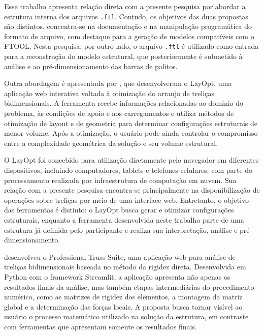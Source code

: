 Esse trabalho apresenta relação direta com a presente pesquisa por abordar a estrutura interna dos arquivos \texttt{.ftl}. Contudo, os objetivos das duas propostas são distintos.  concentra-se na documentação e na manipulação programática do formato de arquivo, com destaque para a geração de modelos compatíveis com o \acrshort{FTOOL}. Nesta pesquisa, por outro lado, o arquivo \texttt{.ftl} é utilizado como entrada para a reconstrução do modelo estrutural, que posteriormente é submetido à análise e ao pré-dimensionamento das barras de palitos.

Outra abordagem é apresentada por , que desenvolveram o LayOpt, uma aplicação web interativa voltada à otimização do arranjo de treliças bidimensionais. A ferramenta recebe informações relacionadas ao domínio do problema, às condições de apoio e aos carregamentos e utiliza métodos de otimização de layout e de geometria para determinar configurações estruturais de menor volume. Após a otimização, o usuário pode ainda controlar o compromisso entre a complexidade geométrica da solução e seu volume estrutural.

O LayOpt foi concebido para utilização diretamente pelo navegador em diferentes dispositivos, incluindo computadores, tablets e telefones celulares, com parte do processamento realizada por infraestrutura de computação em nuvem. Sua relação com a presente pesquisa encontra-se principalmente na disponibilização de operações sobre treliças por meio de uma interface web. Entretanto, o objetivo das ferramentas é distinto: o LayOpt busca gerar e otimizar configurações estruturais, enquanto a ferramenta desenvolvida neste trabalho parte de uma estrutura já definida pelo participante e realiza sua interpretação, análise e pré-dimensionamento.

 desenvolveu o Professional Truss Suite, uma aplicação web para análise de treliças bidimensionais baseada no método da rigidez direta. Desenvolvida em Python com o framework Streamlit, a aplicação apresenta não apenas os resultados finais da análise, mas também etapas intermediárias do procedimento numérico, como as matrizes de rigidez dos elementos, a montagem da matriz global e a determinação das forças locais. A proposta busca tornar visível ao usuário o processo matemático utilizado na solução da estrutura, em contraste com ferramentas que apresentam somente os resultados finais.

